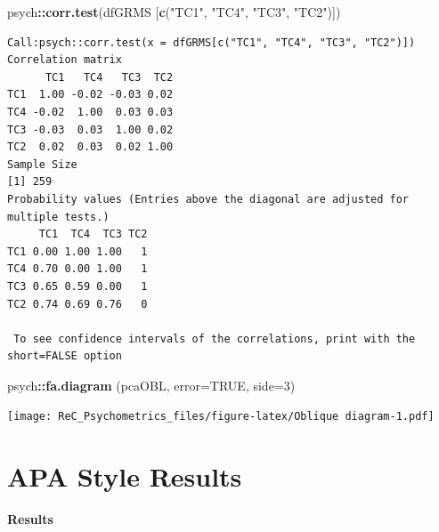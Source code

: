 \documentclass[
  english,
]{book}
\newenvironment{Shaded}{\begin{snugshade}}{\end{snugshade}}
\newcommand{\DataTypeTok}[1]{\textcolor[rgb]{0.13,0.29,0.53}{#1}}
\newcommand{\DecValTok}[1]{\textcolor[rgb]{0.00,0.00,0.81}{#1}}
\newcommand{\KeywordTok}[1]{\textcolor[rgb]{0.13,0.29,0.53}{\textbf{#1}}}
\newcommand{\NormalTok}[1]{#1}
\newcommand{\OperatorTok}[1]{\textcolor[rgb]{0.81,0.36,0.00}{\textbf{#1}}}
\newcommand{\OtherTok}[1]{\textcolor[rgb]{0.56,0.35,0.01}{#1}}
\newcommand{\StringTok}[1]{\textcolor[rgb]{0.31,0.60,0.02}{#1}}
\begin{document}
\begin{Shaded}
\begin{Highlighting}[]
\NormalTok{psych}\OperatorTok{::}\KeywordTok{corr.test}\NormalTok{(dfGRMS [}\KeywordTok{c}\NormalTok{(}\StringTok{"TC1"}\NormalTok{, }\StringTok{"TC4"}\NormalTok{, }\StringTok{"TC3"}\NormalTok{, }\StringTok{"TC2"}\NormalTok{)])}
\end{Highlighting}
\end{Shaded}

\begin{verbatim}
Call:psych::corr.test(x = dfGRMS[c("TC1", "TC4", "TC3", "TC2")])
Correlation matrix 
      TC1   TC4   TC3  TC2
TC1  1.00 -0.02 -0.03 0.02
TC4 -0.02  1.00  0.03 0.03
TC3 -0.03  0.03  1.00 0.02
TC2  0.02  0.03  0.02 1.00
Sample Size 
[1] 259
Probability values (Entries above the diagonal are adjusted for multiple tests.) 
     TC1  TC4  TC3 TC2
TC1 0.00 1.00 1.00   1
TC4 0.70 0.00 1.00   1
TC3 0.65 0.59 0.00   1
TC2 0.74 0.69 0.76   0

 To see confidence intervals of the correlations, print with the short=FALSE option
\end{verbatim}

\begin{Shaded}
\begin{Highlighting}[]
\NormalTok{psych}\OperatorTok{::}\KeywordTok{fa.diagram}\NormalTok{ (pcaOBL, }\DataTypeTok{error=}\OtherTok{TRUE}\NormalTok{, }\DataTypeTok{side=}\DecValTok{3}\NormalTok{)}
\end{Highlighting}
\end{Shaded}

\texttt{[image: ReC\_Psychometrics\_files/figure-latex/Oblique diagram-1.pdf]}

\hypertarget{apa-style-results}{%
\section{APA Style Results}\label{apa-style-results}}

\textbf{Results}
\end{document}
